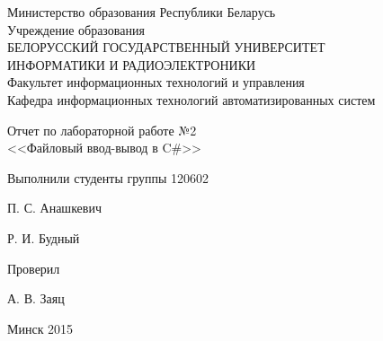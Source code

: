 \thispagestyle{empty}
\setlength{\parindent}{0ex} %

\begin{center}
  Министерство образования Республики Беларусь \\
  \smallskip
  Учреждение образования \\
  БЕЛОРУССКИЙ ГОСУДАРСТВЕННЫЙ УНИВЕРСИТЕТ \\
  ИНФОРМАТИКИ И РАДИОЭЛЕКТРОНИКИ \\
  \smallskip
  Факультет информационных технологий и управления \\
  \smallskip
  Кафедра информационных технологий автоматизированных систем
\end{center}

\vspace{50mm}

\begin{center}
  Отчет по лабораторной работе №2 \\
  <<Файловый ввод-вывод в C\#>> \\
\end{center}

\vspace{60mm}

\begin{minipage}{.55\linewidth}
    Выполнили студенты группы 120602
    \bigskip
\end{minipage}
\hfill
\begin{minipage}{.4\linewidth}
  \begin{flushright}
    П. С. Анашкевич

    Р. И. Будный
  \end{flushright}
\end{minipage}

\vspace{10mm}

\begin{minipage}{.55\linewidth}
    Проверил
\end{minipage}
\hfill
\begin{minipage}{.4\linewidth}
  \begin{flushright}
    А. В. Заяц

  \end{flushright}
\end{minipage}

\vspace{35mm}
\begin{center}
  Минск 2015
\end{center}

\setlength{\parindent}{5ex} %
